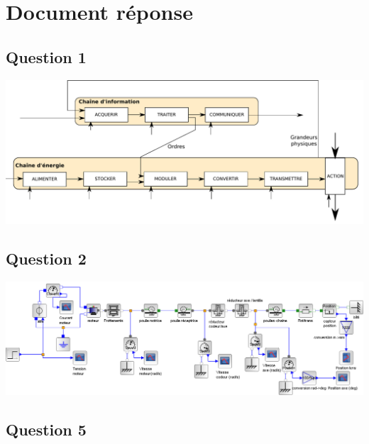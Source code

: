 \newpage
\clearpage
\newpage

\setcounter{page}{1}
\section*{Document réponse}

\subsection*{Question 1}
\begin{center}
\includegraphics[width=1.0\textwidth]{images/chaine_fonctionnelle_0.pdf}
\end{center}


\subsection*{Question 2}
\begin{center}
\includegraphics[width=1.0\textwidth]{images/image13.png}
\end{center}

\subsection*{Question 5}
\begin{center}
\begin{large}
\end{large}
\end{center}

